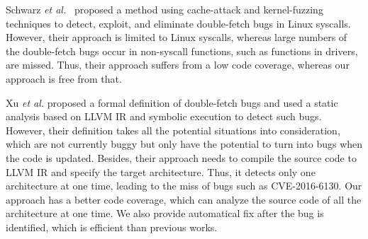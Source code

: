 \documentclass[10pt]{llncs}
\begin{document}
Schwarz \textit{et al.}~\cite{modern} proposed a method using cache-attack and kernel-fuzzing techniques to detect, exploit, and eliminate double-fetch bugs in Linux syscalls. %
However, their approach is limited to Linux syscalls, whereas large numbers of the double-fetch bugs occur in non-syscall functions, such as functions in drivers, are missed. Thus, their approach suffers from a low code coverage, whereas our approach is free from that.%

Xu \textit{et al.}\cite{precise} proposed a formal definition of double-fetch bugs and used a static analysis based on LLVM IR and symbolic execution to detect such bugs. However, their definition takes all the potential situations into consideration, which are not currently buggy but only have the potential to turn into bugs when the code is updated. Besides, their approach needs to compile the source code to LLVM IR and specify the target architecture. Thus, it detects only one architecture at one time, leading to the miss of bugs such as CVE-2016-6130. Our approach has a better code coverage, which can analyze the source code of all the architecture at one time. We also provide automatical fix after the bug is identified, which is efficient than previous works.




\end{document}
